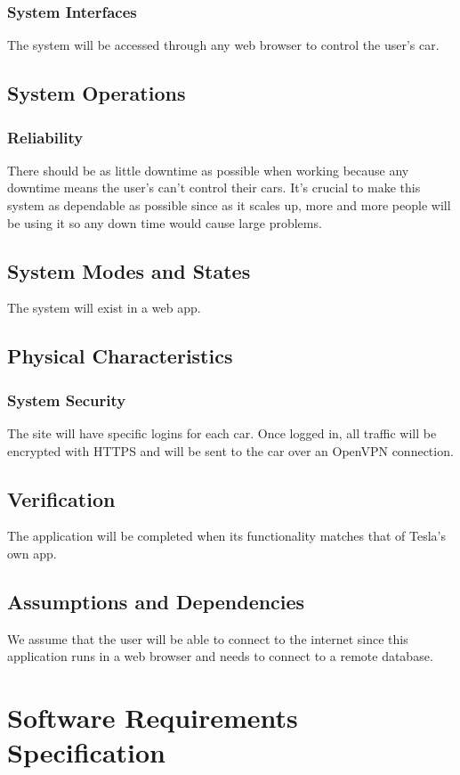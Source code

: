 \documentclass[onecolumn, draftclsnofoot,10pt, compsoc]{IEEEtran}
\begin{document}
\subsubsection{System Interfaces}
The system will be accessed through any web browser to control the user's car.
\subsection{System Operations}
\subsubsection{Reliability}
There should be as little downtime as possible when working because any downtime means the user's can't control their cars.
It's crucial to make this system as dependable as possible since as it scales up, more and more people will be using it so any down time would cause large problems.
\subsection{System Modes and States}
The system will exist in a web app.
\subsection{Physical Characteristics}
\subsubsection{System Security}
The site will have specific logins for each car.
Once logged in, all traffic will be encrypted with HTTPS and will be sent to the car over an OpenVPN connection.
\subsection{Verification}
The application will be completed when its functionality matches that of Tesla's own app.
\subsection{Assumptions and Dependencies}
We assume that the user will be able to connect to the internet since this application runs in a web browser and needs to connect to a remote database.

\section{Software Requirements Specification}
\end{document}
